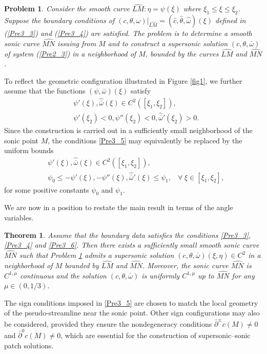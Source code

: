 \documentclass[3p,11pt]{elsarticle}
\numberwithin{equation}{section}
\newtheorem{theorem}{Theorem}[section]
\newtheorem{problem}{Problem}[section]
\begin{document}
\begin{problem}\label{P2}
Consider the smooth curve $\widehat{LM}: \eta=\psi(\xi)$ where $\xi_1\leq \xi\leq \xi_2$. Suppose the boundary conditions of $(c,\theta,\omega)|_{\widehat{LM}}=(\hat c,\hat\theta,\hat\omega)(\xi)$ defined in (\ref{Pre3_3}) and (\ref{Pre3_4}) are satisfied. The problem is to determine a smooth sonic curve $\widehat{MN}$ issuing from $M$ and to construct a supersonic solution $(c,\theta,\bar\omega)$ of system (\ref{Pre2_3}) in a neighborhood of $M$, bounded by the curves $\widehat{LM}$ and $\widehat{MN}$.
\end{problem}
To reflect the geometric configuration illustrated in Figure \ref{fig1}, we further assume that the functions $(\psi,\bar\omega)(\xi)$ satisfy
\begin{equation}\label{Pre3_5}
    \begin{split}
        &\psi'(\xi),{\hat{\bar\omega}}(\xi) \in C^2([\xi_1,\xi_2]),\\
        & \psi'(\xi_2)<0, \psi''(\xi_2)<0, \hat{\bar\omega}'(\xi_2)>0.
    \end{split}
\end{equation}
Since the construction is carried out in a sufficiently small neighborhood of the sonic point $M$, the conditions \eqref{Pre3_5} may equivalently be replaced by the uniform bounds
\begin{equation}\label{Pre3_6}
    \begin{split}
    &\psi'(\xi),{\hat{\bar\omega}}(\xi) \in C^2([\xi_1,\xi_2]),\\
        & \psi_0\leq -\psi'(\xi), -\psi''(\xi), \hat{\bar\omega}'(\xi)\leq \psi_1, \; \; \; \forall \;\xi\in[\xi_1,\xi_2],
    \end{split}
\end{equation}
for some positive constants $\psi_0$ and $\psi_1$.

We are now in a position to restate the main result in terms of the angle variables.

\begin{theorem}\label{Pre_th1}
Assume that the boundary data satisfies the conditions \eqref{Pre3_3}, \eqref{Pre3_4} and \eqref{Pre3_6}. Then there exists a sufficiently small smooth sonic curve $\widehat{MN}$ such that Problem \ref{P2} admits a supersonic solution $(c,\theta,\bar\omega)(\xi,\eta)\in C^2$ in a neighborhood of $M$ bounded by $\widehat{LM}$ and $\widehat{MN}$. Moreover, the sonic curve $\widehat{MN}$ is $C^{1,\mu}$ continuous and the solution $(c,\theta,\bar\omega)$ is uniformly $C^{1,\mu}$ up to $\widehat{MN}$ for any $\mu\in(0,1/3)$.
\end{theorem}
The sign conditions imposed in \eqref{Pre3_5} are chosen to match the local geometry of the pseudo-streamline near the sonic point. Other sign configurations may also be considered, provided they ensure the nondegeneracy conditions $\bar{\partial}^\pm c(M)\neq0$ and $\bar{\partial}^0 c(M)\neq0$, which are essential for the construction of supersonic--sonic patch solutions.
\end{document}
